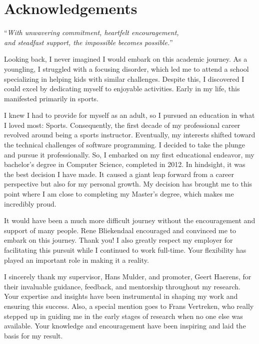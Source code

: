 \chapter*{Acknowledgements}
\small

\begin{center}
\enquote{\textit{With unwavering commitment, heartfelt encouragement, \\and steadfast support, the
impossible becomes possible.}}
\end{center}

Looking back, I never imagined I would embark on this academic journey. As a youngling, I
struggled with a focusing disorder, which led me to attend a school specializing in
helping kids with similar challenges. Despite this, I discovered I could excel by
dedicating myself to enjoyable activities. Early in my life, this manifested primarily in
sports.

I knew I had to provide for myself as an adult, so I pursued an education in what I loved
most: Sports. Consequently, the first decade of my professional career revolved around
being a sports instructor. Eventually, my interests shifted toward the technical
challenges of software programming. I decided to take the plunge and pursue it
professionally. So, I embarked on my first educational endeavor, my bachelor's degree in
Computer Science, completed in 2012. In hindsight, it was the best decision I have made.
It caused a giant leap forward from a career perspective but also for my personal growth.
My decision has brought me to this point where I am close to completing my Master's
degree, which makes me incredibly proud. 

It would have been a much more difficult journey without the encouragement and support of
many people. Rene Bliekendaal encouraged and convinced me to embark on this journey. Thank
you! I also greatly respect my employer for facilitating this pursuit while I continued to work
full-time. Your flexibility has played an important role in making it a reality.

I sincerely thank my supervisor, Hans Mulder, and promoter, Geert Haerens, for their
invaluable guidance, feedback, and mentorship throughout my research. Your expertise and
insights have been instrumental in shaping my work and ensuring this success. Also, a
special mention goes to Frans Vertreken, who really stepped up in guiding me in the early
stages of research when no one else was available. Your knowledge and encouragement have
been inspiring and laid the basis for my result.

